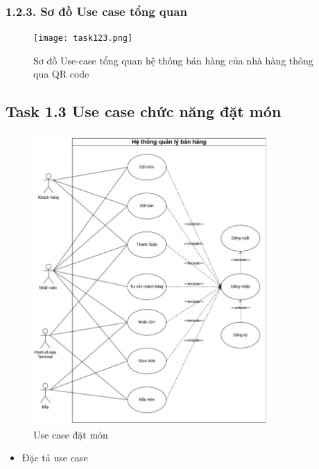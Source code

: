 \documentclass[a4paper]{article}
\begin{document}
\subsubsection{1.2.3. Sơ đồ Use case tổng quan}
    \begin{figure}[H]
        \centering
        \texttt{[image: task123.png]}
        \caption{Sơ đồ Use-case tổng quan hệ thống bán hàng của nhà hàng thông qua QR code}
    \end{figure}

\subsection{Task 1.3 Use case chức năng đặt món}
    \begin{figure}[H]
        \centering
        \includegraphics[width=0.8\textwidth]{task13.png}
        \caption{Use case đặt món}
    \end{figure}
    \begin{itemize}
        \item Đặc tả use case
    \end{itemize}
\end{document}
